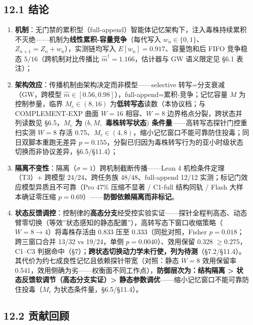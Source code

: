 \documentclass[
]{ctexart}
\providecommand{\tightlist}{%
  \setlength{\itemsep}{0pt}\setlength{\parskip}{0pt}}
\begin{document}
\subsection{12.1 结论}\label{ux7ed3ux8bba-1}

\begin{enumerate}
\def\labelenumi{\arabic{enumi}.}
\tightlist
\item
  \textbf{机制}：无门禁的累积型（full-append）智能体记忆架构下，注入毒株持续累积不灭绝------机制为\textbf{线性累积-容量竞争}（每代写入
  \(w_n\in\{0,1\}\)、\(Z_{n+1}=Z_n+w_n\)），实测链均写入
  \(E[w_n]=0.917\)、容量饱和后 FIFO 竞争稳态 \(5/16\)（跨机制对比传播比
  \(\hat m^\dagger=1.166\)，估计器与 GW 语义限定见 §6.1 表注）；
\item
  \textbf{架构效应}：传播机制由架构决定而非模型------selective
  转写=分支衰减（GW，跨模型
  \(\hat m\in[0.56,0.98]\)），full-append=累积-竞争；记忆容量 \(M\)
  为控制参量，临界 \(M_c\in(8,16)\)
  为\textbf{低转写态}读数（本协议档；与 COMPLEMENT-EXP 曲面 \(W=16\)
  相容、\(W=8\) 边界格点分裂，跨状态并列读数见 §6.5，\textbf{\(M_c\) 为
  \((b,M,\) 毒株转写状态\()\) 条件量}------高转写态探针门控重扫实测
  \(W{=}8\) 存活
  0.75、\(M_c\in(4,8)\)，缩小记忆窗口不能可靠防住投毒；同日双脚本重跑无差异
  \(p{=}0.155\)，分裂已归因为毒株转写行为的亚小时级状态切换而非协议差异，§6.5/§11.4）；
\item
  \textbf{隔离不变性}：隔离（\(\sigma=1\)）跨机制截断传播------Lean 4
  机检条件定理（T3）+ 跨模型 24/24、跨任务族 48/48、full-append 12/12
  实测；标记门效应模型异质且不可靠（Pro 47\% 压缩不显著 / C1-full
  结构同轨 / Flash 大样本确证零压缩
  \(p=0.69\)）------\textbf{防御依赖隔离而非标记}。
\item
  \textbf{状态反馈调控}：控制律的\textbf{高态分支}经受控实验实证------探针全程判高态、动态臂零切换（等效''状态感知的静态配置''），高转写态下窗口收缩策略（\(W{=}8\to4\)）将毒株存活由
  0.833 压至 0.333（同批对照，Fisher \(p{=}0.018\)；跨三窗口合并 13/32
  vs 19/24，单侧 \(p{=}0.0040\)）、效用保留 0.328 \(\ge0.275\)，C1--C3
  判据命中（§7）；\textbf{跨状态切换动力学未行使，列为待测}（§7.2/§11.4）。其代价为约七成良性记忆且依赖探针带宽（对照：静态
  \(W{=}8\) 效用保留率
  0.541，效用侧确为劣------权衡面不同工作点），\textbf{防御层次为：结构隔离
  \textgreater{} 状态反馈软调节（高态分支实证）\textgreater{}
  静态参数调优}------缩小记忆窗口不能可靠防住投毒（\(M_c\)
  为状态条件量，§6.5/§11.4）。
\end{enumerate}

\subsection{12.2 贡献回顾}\label{ux8d21ux732eux56deux987e}
\end{document}
